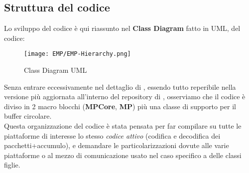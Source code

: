 \subsection{Struttura del codice}
Lo sviluppo del codice è qui riassunto nel \textbf{Class Diagram} fatto in UML, del codice:
\begin{figure}[H]
	\centering
	\caption[Class Diagram UML di EMP]{Class Diagram UML}
	\texttt{[image: EMP/EMP-Hierarchy.png]}
\end{figure}
\noindent
Senza entrare eccessivamente nel dettaglio di , essendo tutto reperibile nella versione più aggiornata all'interno del repository di \cite*{EMP}, osserviamo che il codice è diviso in 2 macro blocchi (\textbf{MPCore}, \textbf{MP}) più una classe di supporto per il buffer circolare.\\
Questa organizzazione del codice è stata pensata per far compilare su tutte le piattaforme di interesse lo stesso \textit{codice attivo} (codifica e decodifica dei pacchetti+accumulo), e demandare le particolarizzazioni dovute alle varie piattaforme o al mezzo di comunicazione usato nel caso specifico a delle classi figlie.\\
